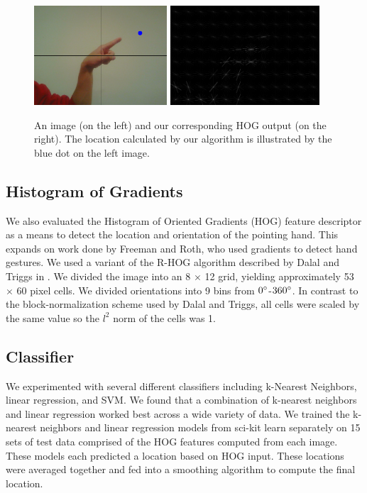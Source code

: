 \documentclass[10pt,twocolumn,letterpaper]{article}
\begin{document}
\begin{figure}
	\begin{center}
		\includegraphics[height=140px]{figures/PointImage.png}
		\includegraphics[height=140px]{figures/PointHOG.png}
	\end{center}
	\caption{An image (on the left) and our corresponding HOG output (on the right). The location calculated by our algorithm is illustrated by the blue dot on the left image.}
	\label{fig:pointImages}
\end{figure}

\subsection{Histogram of Gradients}

We also evaluated the Histogram of Oriented Gradients (HOG) feature descriptor \cite{dalal2005histograms} as a means to detect the location and orientation of the pointing hand. This expands on work done by Freeman and Roth, who used gradients to detect hand gestures. We used a variant of the R-HOG algorithm described by Dalal and Triggs in \cite{dalal2005histograms}. We divided the image into an 8 $\times$ 12 grid, yielding approximately 53 $\times$ 60 pixel cells. We divided orientations into 9 bins from $0\degree$-$360\degree$. In contrast to the block-normalization scheme used by Dalal and Triggs, all cells were scaled by the same value so the $l^2$ norm of the cells was 1.

\subsection{Classifier}
We experimented with several different classifiers including k-Nearest Neighbors, linear regression, and SVM. We found that a combination of k-nearest neighbors and linear regression worked best across a wide variety of data. We trained the k-nearest neighbors and linear regression models from sci-kit learn separately on 15 sets of test data comprised of the HOG features computed from each image. These models each predicted a location based on HOG input. These locations were averaged together and fed into a smoothing algorithm to compute the final location.
\end{document}
